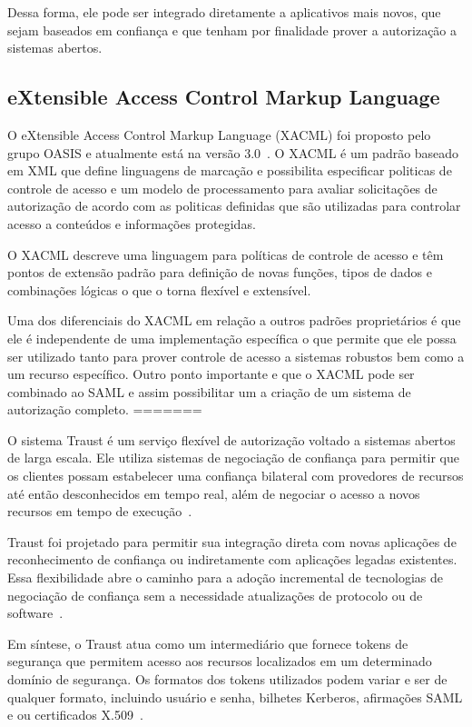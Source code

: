 Dessa forma, ele pode ser integrado diretamente a aplicativos mais novos, que sejam baseados em confiança e que tenham por finalidade  prover a autorização a sistemas abertos.

\subsection{eXtensible Access Control Markup Language}
O eXtensible Access Control Markup Language (XACML) foi proposto pelo grupo OASIS e atualmente está na versão 3.0~\cite{XACML}. O XACML é um padrão baseado em XML que define linguagens de marcação e possibilita especificar politicas de controle de acesso e um modelo de processamento para avaliar solicitações de autorização de acordo com as politicas definidas que são utilizadas para controlar acesso a conteúdos e informações protegidas.

O XACML descreve uma linguagem para políticas de controle de acesso e têm pontos de extensão padrão para definição de novas funções, tipos de dados e combinações lógicas o que o torna flexível e extensível.

Uma dos diferenciais do XACML em relação a outros padrões proprietários é que ele é independente de uma implementação específica o que permite que ele possa ser utilizado tanto para prover controle de acesso a sistemas robustos bem como a um recurso específico. Outro ponto importante e que o XACML pode ser combinado ao SAML e assim possibilitar um a criação de um sistema de autorização completo.
=======

O sistema Traust é um serviço flexível de autorização voltado a sistemas abertos de larga escala. Ele utiliza sistemas de negociação de confiança para permitir que os clientes possam estabelecer uma confiança bilateral com provedores de recursos até então desconhecidos em tempo real, além de negociar o acesso a novos recursos em tempo de execução~\cite{traust08}.

Traust foi projetado para permitir sua integração direta com novas aplicações de reconhecimento de confiança ou indiretamente com aplicações legadas existentes. Essa flexibilidade abre o caminho para a adoção incremental de tecnologias de negociação de confiança sem a necessidade atualizações de protocolo ou de software~\cite{traust08}.

Em síntese, o Traust atua como um intermediário que fornece tokens de segurança que permitem acesso aos recursos localizados em um determinado domínio de segurança. Os formatos dos tokens utilizados podem variar e ser de qualquer formato, incluindo usuário e senha, bilhetes Kerberos, afirmações SAML e ou certificados X.509~\cite{traust08}.

